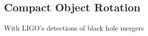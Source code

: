 {\color{orange}

\subsection{Compact Object Rotation}

With LIGO's detections of black hole mergers

}
